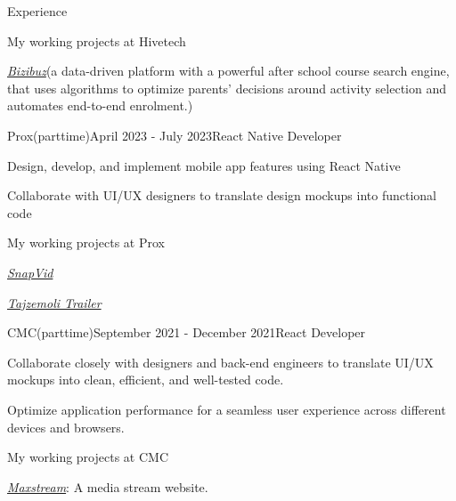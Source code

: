 \documentclass{resume}
\begin{document}
\begin{rSection}{Experience}
    \begin{rSubsection}{}{}{My working projects at Hivetech}{}
      \item \href{https://bizibuz.com/}{\emph{Bizibuz}}(a data-driven platform with a powerful after school course search engine, that uses algorithms to optimize parents’ decisions around activity selection and automates end-to-end enrolment.)
    \end{rSubsection}

    \begin{rSubsection}{Prox(parttime)}{April 2023 - July 2023}{React Native Developer}{}
      \item Design, develop, and implement mobile app features using React Native
      \item Collaborate with UI/UX designers to translate design mockups into functional code
    \end{rSubsection}

    \begin{rSubsection}{}{}{My working projects at Prox}{}
      \item \href{https://apps.apple.com/us/app/pure-tubi-mp3-player/id1658133343}{\emph{SnapVid}}
      \item \href{https://apps.apple.com/vn/app/id1617873009}{\emph{Tajzemoli Trailer}}
    \end{rSubsection}

    \begin{rSubsection}{CMC(parttime)}{September 2021 - December 2021}{React Developer}{}
      \item Collaborate closely with designers and back-end engineers to translate UI/UX mockups into clean, efficient, and well-tested code.
      \item Optimize application performance for a seamless user experience across different devices and browsers.
    \end{rSubsection}

    \begin{rSubsection}{}{}{My working projects at CMC}{}
      \item \href{https://maxstream.tv/}{\emph{Maxstream}}: A media stream website.
    \end{rSubsection}



\end{rSection}
\end{document}
